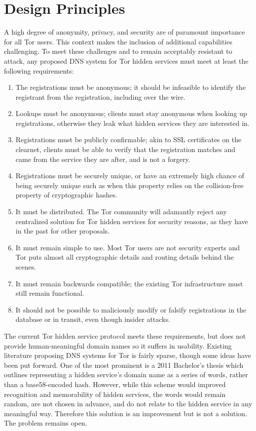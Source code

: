 \documentclass[journal]{IEEEtran}
\begin{document}
\section{Design Principles}

A high degree of anonymity, privacy, and security are of paramount importance for all Tor users. This context makes the inclusion of additional capabilities challenging. To meet these challenges and to remain acceptably resistant to attack, any proposed DNS system for Tor hidden services must meet at least the following requirements:

\begin{enumerate}
	\item The registrations must be anonymous; it should be infeasible to identify the registrant from the registration, including over the wire.
	\item Lookups must be anonymous; clients must stay anonymous when looking up registrations, otherwise they leak what hidden services they are interested in.
	\item Registrations must be publicly confirmable; akin to SSL certificates on the clearnet, clients must be able to verify that the registration matches and came from the service they are after, and is not a forgery.
	\item Registrations must be securely unique, or have an extremely high chance of being securely unique such as when this property relies on the collision-free property of cryptographic hashes.
	\item It must be distributed. The Tor community will adamantly reject any centralized solution for Tor hidden services for security reasons, as they have in the past for other proposals.
	\item It must remain simple to use. Most Tor users are not security experts and Tor puts almost all cryptographic details and routing details behind the scenes.
	\item It must remain backwards compatible; the existing Tor infrastructure must still remain functional.
	\item It should not be possible to maliciously modify or falsify registrations in the database or in transit, even though insider attacks.
\end{enumerate}

The current Tor hidden service protocol meets these requirements, but does not provide human-meaningful domain names so it suffers in usability. Existing literature proposing DNS systems for Tor is fairly sparse, though some ideas have been put forward. One of the most prominent is a 2011 Bachelor's thesis which outlines representing a hidden service's domain name as a series of words, rather than a base58-encoded hash.\cite{NicolussiThesis2011} However, while this scheme would improved recognition and memorability of hidden services, the words would remain random, are not chosen in advance, and do not relate to the hidden service in any meaningful way. Therefore this solution is an improvement but is not a solution. The problem remains open.
\end{document}
